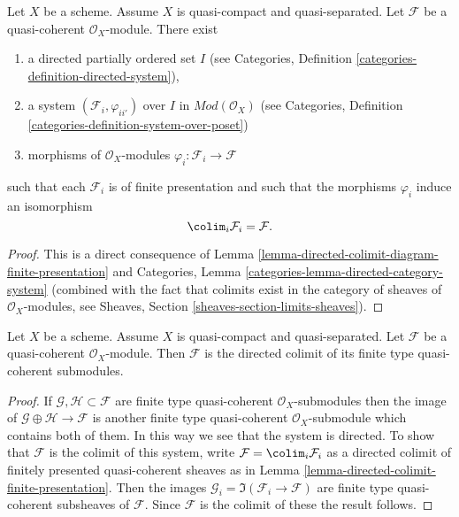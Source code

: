 \begin{lemma}
\label{lemma-directed-colimit-finite-presentation}
Let $X$ be a scheme. Assume $X$ is quasi-compact and quasi-separated.
Let $\mathcal{F}$ be a quasi-coherent $\mathcal{O}_X$-module.
There exist
\begin{enumerate}
\item a directed partially ordered set $I$ (see
Categories, Definition \ref{categories-definition-directed-system}),
\item a system $(\mathcal{F}_i, \varphi_{ii'})$
over $I$ in $\textit{Mod}(\mathcal{O}_X)$ (see
Categories, Definition \ref{categories-definition-system-over-poset})
\item morphisms of $\mathcal{O}_X$-modules
$\varphi_i : \mathcal{F}_i \to \mathcal{F}$
\end{enumerate}
such that each $\mathcal{F}_i$ is of finite presentation
and such that the morphisms $\varphi_i$ induce an isomorphism
$$
\colim_i \mathcal{F}_i
=
\mathcal{F}.
$$
\end{lemma}

\begin{proof}
This is a direct consequence of
Lemma \ref{lemma-directed-colimit-diagram-finite-presentation} and
Categories, Lemma \ref{categories-lemma-directed-category-system}
(combined with the fact that
colimits exist in the category of sheaves of $\mathcal{O}_X$-modules, see
Sheaves, Section \ref{sheaves-section-limits-sheaves}).
\end{proof}

\begin{lemma}
\label{lemma-directed-colimit-finite-type}
Let $X$ be a scheme. Assume $X$ is quasi-compact and quasi-separated.
Let $\mathcal{F}$ be a quasi-coherent $\mathcal{O}_X$-module.
Then $\mathcal{F}$ is the directed colimit of its finite type
quasi-coherent submodules.
\end{lemma}

\begin{proof}
If $\mathcal{G}, \mathcal{H} \subset \mathcal{F}$ are finite type
quasi-coherent $\mathcal{O}_X$-submodules then the image
of $\mathcal{G} \oplus \mathcal{H} \to \mathcal{F}$ is another
finite type quasi-coherent $\mathcal{O}_X$-submodule which contains
both of them. In this way we see that the system is directed.
To show that $\mathcal{F}$ is the colimit of this system, write
$\mathcal{F} = \colim_i \mathcal{F}_i$ as a directed
colimit of finitely presented quasi-coherent sheaves as in
Lemma \ref{lemma-directed-colimit-finite-presentation}.
Then the images $\mathcal{G}_i = \Im(\mathcal{F}_i \to \mathcal{F})$ are
finite type quasi-coherent subsheaves of $\mathcal{F}$. Since
$\mathcal{F}$ is the colimit of these the result follows.
\end{proof}

